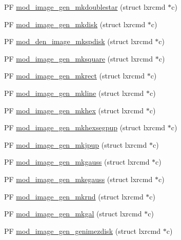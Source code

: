 \begin{DoxyCompactItemize}
\item 
P\+F \hyperlink{image__gen-util_8c_ae711902bde27e26dc070bda9087c1628}{mod\+\_\+image\+\_\+gen\+\_\+mkdoublestar} (struct lxrcmd $\ast$c)
\item 
P\+F \hyperlink{image__gen-util_8c_a3d80af29d0752bc59a85d13fd3acc09c}{mod\+\_\+image\+\_\+gen\+\_\+mkdisk} (struct lxrcmd $\ast$c)
\item 
P\+F \hyperlink{image__gen-util_8c_aa3f0614861b90486ed8450153d073633}{mod\+\_\+den\+\_\+image\+\_\+mkspdisk} (struct lxrcmd $\ast$c)
\item 
P\+F \hyperlink{image__gen-util_8c_a07f8ed2e7bbf4a7fd8bf4445148304ee}{mod\+\_\+image\+\_\+gen\+\_\+mksquare} (struct lxrcmd $\ast$c)
\item 
P\+F \hyperlink{image__gen-util_8c_a72b25a6d62a1c60cae1a47a6322eac92}{mod\+\_\+image\+\_\+gen\+\_\+mkrect} (struct lxrcmd $\ast$c)
\item 
P\+F \hyperlink{image__gen-util_8c_abea55b6781ae9f67de79dc5282057c6a}{mod\+\_\+image\+\_\+gen\+\_\+mkline} (struct lxrcmd $\ast$c)
\item 
P\+F \hyperlink{image__gen-util_8c_a20cbf717cff48a21b32b329d75957208}{mod\+\_\+image\+\_\+gen\+\_\+mkhex} (struct lxrcmd $\ast$c)
\item 
P\+F \hyperlink{image__gen-util_8c_adfa79e5d577753c71ba0fd2230c63d42}{mod\+\_\+image\+\_\+gen\+\_\+mkhexsegpup} (struct lxrcmd $\ast$c)
\item 
P\+F \hyperlink{image__gen-util_8c_aa8ccdbd620046813b2eff887fa6d06ac}{mod\+\_\+image\+\_\+gen\+\_\+mkjpup} (struct lxrcmd $\ast$c)
\item 
P\+F \hyperlink{image__gen-util_8c_a3ce403061bd5d2d1671a3cb28daa8662}{mod\+\_\+image\+\_\+gen\+\_\+mkgauss} (struct lxrcmd $\ast$c)
\item 
P\+F \hyperlink{image__gen-util_8c_a5212fcc463c8f1c9dc689b1f0b35f905}{mod\+\_\+image\+\_\+gen\+\_\+mkegauss} (struct lxrcmd $\ast$c)
\item 
P\+F \hyperlink{image__gen-util_8c_a07401df65054a16dde93b91c71d30e87}{mod\+\_\+image\+\_\+gen\+\_\+mkrnd} (struct lxrcmd $\ast$c)
\item 
P\+F \hyperlink{image__gen-util_8c_a92a1d5daf076e57bb4050df292498dbb}{mod\+\_\+image\+\_\+gen\+\_\+mkgal} (struct lxrcmd $\ast$c)
\item 
P\+F \hyperlink{image__gen-util_8c_a1890dde947828ecf0db0ae31ab8fe323}{mod\+\_\+image\+\_\+gen\+\_\+genimezdisk} (struct lxrcmd $\ast$c)
\item 

\end{DoxyCompactItemize}
